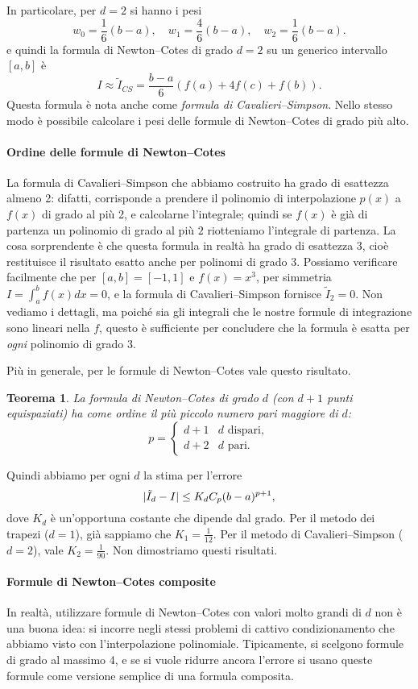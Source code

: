 \documentclass[a4paper]{report}
\DeclarePairedDelimiter{\abs}{\lvert}{\rvert}
\newtheorem{theorem}{Teorema}[chapter]
\theoremstyle{definiton}
\theoremstyle{remark}
\begin{document}
In particolare, per $d=2$ si hanno i pesi
\[
w_0 = \frac16(b-a), \quad w_1 = \frac46 (b-a), \quad w_2 = \frac16 (b-a).
\]
e quindi la formula di Newton--Cotes di grado $d=2$ su un generico intervallo $[a,b]$ è
\[
I \approx \tilde{I}_{CS} = \frac{b-a}{6}\left(f(a) + 4f(c) + f(b)\right).
\]
Questa formula è nota anche come \emph{formula di Cavalieri--Simpson}. Nello stesso modo è possibile calcolare i pesi delle formule di Newton--Cotes di grado più alto.



\paragraph{Ordine delle formule di Newton--Cotes}

La formula di Cavalieri--Simpson che abbiamo costruito ha grado di esattezza almeno 2: difatti, corrisponde a prendere il polinomio di interpolazione $p(x)$ a $f(x)$ di grado al più 2, e calcolarne l'integrale; quindi se $f(x)$ è già di partenza un polinomio di grado al più $2$ riotteniamo l'integrale di partenza. La cosa sorprendente è che questa formula in realtà ha grado di esattezza 3, cioè restituisce il risultato esatto anche per polinomi di grado $3$. Possiamo verificare facilmente che per $[a,b]=[-1,1]$ e $f(x)=x^3$, per simmetria $I = \int_{a}^b f(x) dx = 0$, e la  formula di Cavalieri--Simpson fornisce $\tilde{I}_2=0$. Non vediamo i dettagli, ma poiché sia gli integrali che le nostre formule di integrazione sono lineari nella $f$, questo è sufficiente per concludere che la formula è esatta per \emph{ogni} polinomio di grado 3.

Più in generale, per le formule di Newton--Cotes vale questo risultato.
\begin{theorem}
La formula di Newton--Cotes di grado $d$ (con $d+1$ punti equispaziati) ha come ordine il più piccolo numero pari maggiore di $d$:
\[
p = \begin{cases}
    d+1 & \text{$d$ dispari},\\
    d+2 & \text{$d$ pari}.
\end{cases}
\]
\end{theorem}
Quindi abbiamo per ogni $d$ la stima per l'errore
\[
\abs{\tilde{I}_d - I} \leq K_d C_{p} (b-a)^{p+1},
\]
dove $K_d$ è un'opportuna costante che dipende dal grado. Per il metodo dei trapezi ($d=1$), già sappiamo che $K_1 = \frac{1}{12}$. Per il metodo di Cavalieri--Simpson ($d=2$), vale $K_2 = \frac{1}{90}$. Non dimostriamo questi risultati.

\paragraph{Formule di Newton--Cotes composite}
In realtà, utilizzare formule di Newton--Cotes con valori molto grandi di $d$ non è una buona idea: si incorre negli stessi problemi di cattivo condizionamento che abbiamo visto con l'interpolazione polinomiale. Tipicamente, si scelgono formule di grado al massimo 4, e se si vuole ridurre ancora l'errore si usano queste formule come versione semplice di una formula composita.
\end{document}
